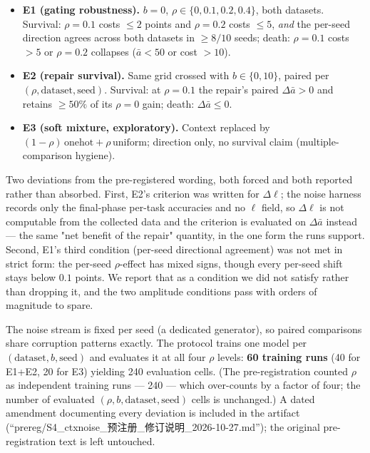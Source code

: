 \documentclass[10pt]{article}
\begin{document}
\begin{itemize}
\item \textbf{E1 (gating robustness).} $b{=}0$, $\rho \in
\{0, 0.1, 0.2, 0.4\}$, both datasets. Survival: $\rho{=}0.1$ costs
$\le 2$ points and $\rho{=}0.2$ costs $\le 5$, \emph{and} the
per-seed direction agrees across both datasets in $\ge 8/10$ seeds;
death: $\rho{=}0.1$ costs
$>5$ or $\rho{=}0.2$ collapses ($\bar a < 50$ or cost $>10$).
\item \textbf{E2 (repair survival).} Same grid crossed with
$b \in \{0, 10\}$, paired per $(\rho, \text{dataset}, \text{seed})$.
Survival: at $\rho{=}0.1$ the repair's paired $\Delta\bar a > 0$ and
retains $\ge 50\%$ of its $\rho{=}0$ gain; death: $\Delta\bar a \le 0$.
\item \textbf{E3 (soft mixture, exploratory).} Context replaced by
$(1-\rho)\,\mathrm{onehot} + \rho\,\mathrm{uniform}$; direction only,
no survival claim (multiple-comparison hygiene).
\end{itemize}

Two deviations from the pre-registered wording, both forced and both
reported rather than absorbed. First, E2's criterion was written for
$\Delta\ell$; the noise harness records only the final-phase
per-task accuracies and no $\ell$ field, so $\Delta\ell$ is not
computable from the collected data and the criterion is evaluated on
$\Delta\bar a$ instead --- the same "net benefit of the repair"
quantity, in the one form the runs support. Second, E1's third
condition (per-seed directional agreement) was not met in strict
form: the per-seed $\rho$-effect has mixed signs, though every
per-seed shift stays below $0.1$ points. We report that as a
condition we did not satisfy rather than dropping it, and the two
amplitude conditions pass with orders of magnitude to spare.

The noise stream is fixed per seed (a dedicated generator), so paired
comparisons share corruption patterns exactly. The protocol trains one
model per $(\text{dataset}, b, \text{seed})$ and evaluates it at all
four $\rho$ levels: \textbf{60 training runs} (40 for E1+E2, 20 for E3)
yielding 240 evaluation cells. (The pre-registration counted $\rho$ as
independent training runs --- 240 --- which over-counts by a factor of
four; the number of evaluated $(\rho, b, \text{dataset}, \text{seed})$
cells is unchanged.) A dated amendment documenting every deviation is
included in the artifact
(``prereg/S4\_ctxnoise\_预注册\_修订说明\_2026-10-27.md''); the original
pre-registration text is left untouched.
\end{document}
